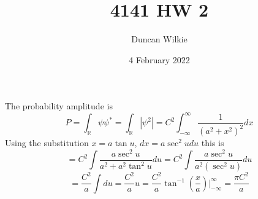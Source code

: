 \documentclass{article}
\title{4141 HW 2}
\author{Duncan Wilkie}
\date{4 February 2022}
\begin{document}
\maketitle

\section{}
The probability amplitude is
\[P=\int_\mathbb{R}\psi\psi^*=\int_\mathbb{R}|\psi^2|=C^2\int_{-\infty}^\infty\frac{1}{(a^2+x^2)^2}dx\]
Using the substitution $x=a\tan u$, $dx=a\sec^2u du$ this is
\[=C^2\int\frac{a\sec^2u}{a^2+a^2\tan^2u}du=C^2\int\frac{a\sec^2u}{a^2(\sec^2u)}du\]
\[=\frac{C^2}{a}\int du=\frac{C^2}{a}u=\frac{C^2}{a}\tan^{-1}\left( \frac{x}{a} \right)\bigg|_{-\infty}^\infty=\frac{\pi C^2}{a}\]
\end{document}
